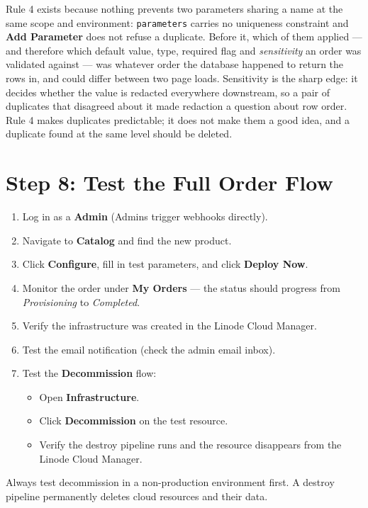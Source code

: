 \documentclass[12pt,a4paper,twoside]{report}
\newcommand{\warnbox}[1]{\begin{tcolorbox}[warnboxstyle]#1\end{tcolorbox}}
\newcommand{\code}[1]{\texttt{#1}}
\newcommand{\role}[1]{\textsf{\textbf{#1}}}
\begin{document}
Rule 4 exists because nothing prevents two parameters sharing a name at
the same scope and environment: \code{parameters} carries no uniqueness
constraint and \textbf{Add Parameter} does not refuse a duplicate. Before
it, which of them applied --- and therefore which default value, type,
required flag and \emph{sensitivity} an order was validated against ---
was whatever order the database happened to return the rows in, and could
differ between two page loads. Sensitivity is the sharp edge: it decides
whether the value is redacted everywhere downstream, so a pair of
duplicates that disagreed about it made redaction a question about row
order. Rule 4 makes duplicates predictable; it does not make them a good
idea, and a duplicate found at the same level should be deleted.

\section{Step 8: Test the Full Order Flow}

\begin{enumerate}
  \item Log in as a \role{Admin} (Admins trigger webhooks directly).
  \item Navigate to \textbf{Catalog} and find the new product.
  \item Click \textbf{Configure}, fill in test parameters, and
        click \textbf{Deploy Now}.
  \item Monitor the order under \textbf{My Orders} — the status should
        progress from \textit{Provisioning} to \textit{Completed}.
  \item Verify the infrastructure was created in the Linode Cloud
        Manager.
  \item Test the email notification (check the admin email inbox).
  \item Test the \textbf{Decommission} flow:
        \begin{itemize}
          \item Open \textbf{Infrastructure}.
          \item Click \textbf{Decommission} on the test resource.
          \item Verify the destroy pipeline runs and the resource
                disappears from the Linode Cloud Manager.
        \end{itemize}
\end{enumerate}

\warnbox{Always test decommission in a non-production environment first.
A destroy pipeline permanently deletes cloud resources and their data.}
\end{document}
